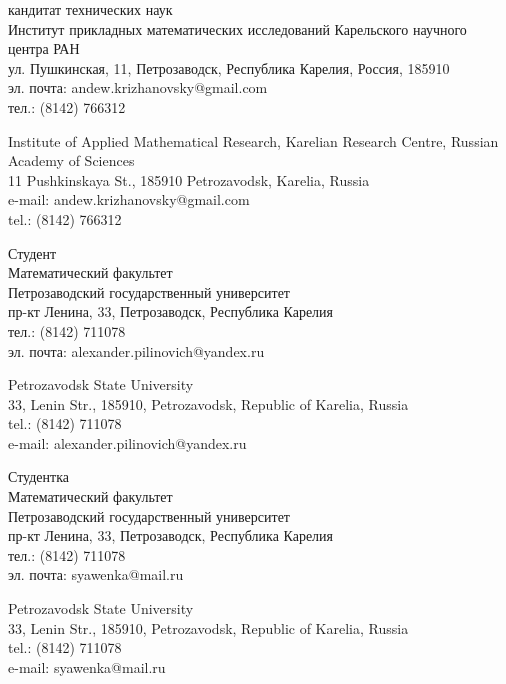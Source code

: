 \documentclass{article}
\begin{document}
\begin{aboutauthors}
кандитат технических наук\\ 
Институт прикладных математических исследований Карельского научного центра РАН\\ 
ул. Пушкинская, 11, Петрозаводск, Республика Карелия, Россия, 185910\\
эл. почта: andew.krizhanovsky@gmail.com\\
тел.: (8142) 766312

\columnbreak

Institute of Applied Mathematical Research, Karelian Research Centre, Russian Academy of Sciences\\
11 Pushkinskaya St., 185910 Petrozavodsk, Karelia, Russia\\
e-mail: andew.krizhanovsky@gmail.com\\
tel.: (8142) 766312
\end{aboutauthors}

\begin{aboutauthors}
Студент\\
Математический факультет\\ 
Петрозаводский государственный университет\\
пр-кт Ленина, 33, Петрозаводск, Республика Карелия\\
тел.: (8142) 711078\\
эл. почта: alexander.pilinovich@yandex.ru

\columnbreak

Petrozavodsk State University\\
33, Lenin Str., 185910, Petrozavodsk, Republic of Karelia, Russia\\
tel.: (8142) 711078\\
e-mail: alexander.pilinovich@yandex.ru 
\end{aboutauthors}

\begin{aboutauthors}
Студентка\\
Математический факультет\\ 
Петрозаводский государственный университет\\
пр-кт Ленина, 33, Петрозаводск, Республика Карелия\\
тел.: (8142) 711078\\
эл. почта: syawenka@mail.ru

\columnbreak

Petrozavodsk State University\\
33, Lenin Str., 185910, Petrozavodsk, Republic of Karelia, Russia\\
tel.: (8142) 711078\\
e-mail: syawenka@mail.ru 
\end{aboutauthors}
\end{document}
